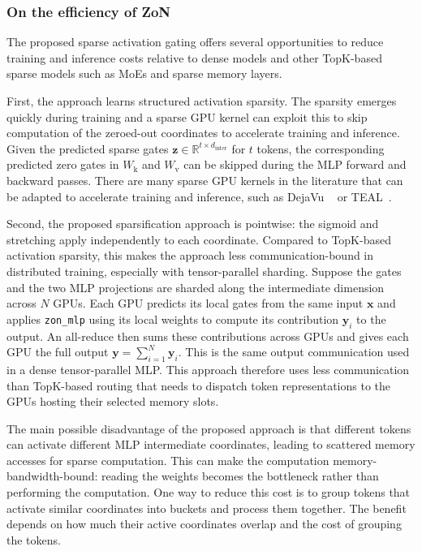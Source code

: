 \subsubsection{On the efficiency of ZoN}
The proposed sparse activation gating offers several opportunities to reduce training and
inference costs relative to dense models and other TopK-based sparse models such
as MoEs and sparse memory layers.

First, the approach learns structured activation sparsity. The sparsity
emerges quickly during training and a sparse GPU kernel can exploit this to skip
computation of the zeroed-out coordinates to accelerate training and inference.
Given the predicted sparse gates $\mathbf{z} \in \mathbb{R}^{t \times d_{\text{inter}}}$ for $t$ tokens,
the corresponding predicted zero gates in $W_\text{k}$ and $W_\text{v}$ can be skipped
during the MLP forward and backward passes. There are many sparse GPU kernels in the literature
that can be adapted to accelerate training and inference, such as DejaVu
~\citep{liu2023dejavucontextualsparsity} or TEAL~\citep{TEAL}.

Second, the proposed sparsification approach is pointwise:
the sigmoid and stretching apply independently
to each coordinate. Compared to TopK-based activation sparsity,
this makes the approach less communication-bound in
distributed training, especially with tensor-parallel sharding.
Suppose the gates and the two MLP projections are sharded
along the intermediate dimension across $N$ GPUs.
Each GPU predicts its local gates from the same input $\mathbf{x}$ and applies
\texttt{zon\_mlp} using its local weights to compute its contribution
$\mathbf{y}_i$ to the output. An all-reduce then sums these contributions across
GPUs and gives each GPU the full output $\mathbf{y}=\sum_{i=1}^{N}\mathbf{y}_i$.
This is the same output communication used in a dense tensor-parallel MLP.
This approach therefore uses less communication than TopK-based
routing that needs to dispatch token representations to the
GPUs hosting their selected memory slots.

The main possible disadvantage of the proposed approach is
that different tokens can activate different MLP intermediate coordinates,
leading to scattered memory accesses for sparse computation.
This can make the computation memory-bandwidth-bound: reading the weights becomes
the bottleneck rather than performing the computation. One way to reduce this cost
is to group tokens that activate similar coordinates into buckets and process them
together. The benefit depends on how much their active coordinates overlap
and the cost of grouping the tokens.

